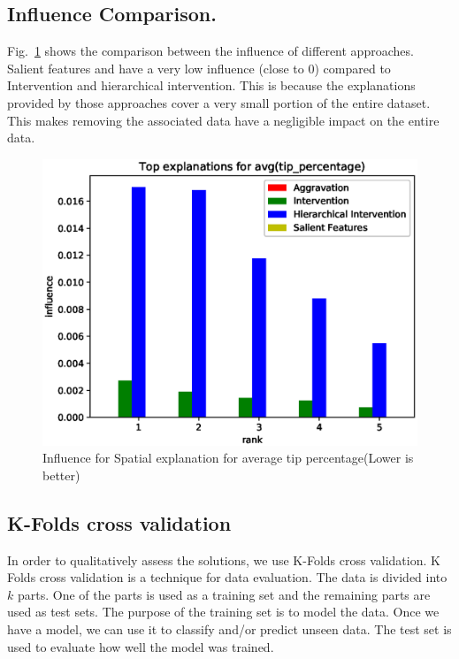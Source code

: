 \subsection{Influence Comparison.}
Fig.~\ref{fig:influence_comparison} shows the comparison between the influence of different approaches. Salient features and {\aggravation} have a very low influence (close to 0) compared to Intervention and hierarchical intervention. This is because the explanations provided by those approaches cover a very small portion of the entire dataset. This makes removing the associated data have a negligible impact on the entire data.
\begin{figure}[h]
\includegraphics[width=\columnwidth]{images/Top_explanations_for_avg_tip_percentage_influence}
\caption{Influence for Spatial explanation for average tip percentage(Lower is better)}
\label{fig:influence_comparison}
\end{figure}

\subsection{K-Folds cross validation}
In order to qualitatively assess the solutions, we use K-Folds cross validation\cite{refaeilzadeh2009cross}. 
K Folds cross validation is a technique for data evaluation\cite{kohavi1995study,refaeilzadeh2009cross}. The data is divided into $k$ parts. One of the parts is used as a training set and the remaining parts are used as test sets. The purpose of the training set is to model the data. Once we have a model, we can use it to classify and/or predict unseen data. The test set is used to evaluate how well the model was trained.

